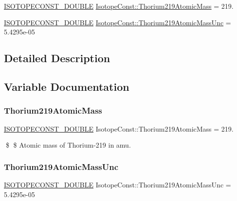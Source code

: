 \begin{DoxyCompactItemize}
\item 
\mbox{\hyperlink{group___isotope_const-_macros_ga8f45a7272ce02c0b4c65c44636ed719a}{I\+S\+O\+T\+O\+P\+E\+C\+O\+N\+S\+T\+\_\+\+D\+O\+U\+B\+LE}} \mbox{\hyperlink{group___isotope_const-_thorium-_th219_ga52852a0c7b61b350a2b85c043e5eaa58}{Isotope\+Const\+::\+Thorium219\+Atomic\+Mass}} = 219.
\item 
\mbox{\hyperlink{group___isotope_const-_macros_ga8f45a7272ce02c0b4c65c44636ed719a}{I\+S\+O\+T\+O\+P\+E\+C\+O\+N\+S\+T\+\_\+\+D\+O\+U\+B\+LE}} \mbox{\hyperlink{group___isotope_const-_thorium-_th219_gaa8bd56651616eb011b84f09976770a04}{Isotope\+Const\+::\+Thorium219\+Atomic\+Mass\+Unc}} = 5.\+4295e-\/05
\end{DoxyCompactItemize}


\subsection{Detailed Description}


\subsection{Variable Documentation}
\mbox{\label{group___isotope_const-_thorium-_th219_ga52852a0c7b61b350a2b85c043e5eaa58}} 
\subsubsection{\texorpdfstring{Thorium219\+Atomic\+Mass}{Thorium219AtomicMass}}
{\footnotesize\ttfamily \mbox{\hyperlink{group___isotope_const-_macros_ga8f45a7272ce02c0b4c65c44636ed719a}{I\+S\+O\+T\+O\+P\+E\+C\+O\+N\+S\+T\+\_\+\+D\+O\+U\+B\+LE}} Isotope\+Const\+::\+Thorium219\+Atomic\+Mass = 219.}

\$ \$ Atomic mass of Thorium-\/219 in amu. \mbox{\label{group___isotope_const-_thorium-_th219_gaa8bd56651616eb011b84f09976770a04}} 
\subsubsection{\texorpdfstring{Thorium219\+Atomic\+Mass\+Unc}{Thorium219AtomicMassUnc}}
{\footnotesize\ttfamily \mbox{\hyperlink{group___isotope_const-_macros_ga8f45a7272ce02c0b4c65c44636ed719a}{I\+S\+O\+T\+O\+P\+E\+C\+O\+N\+S\+T\+\_\+\+D\+O\+U\+B\+LE}} Isotope\+Const\+::\+Thorium219\+Atomic\+Mass\+Unc = 5.\+4295e-\/05}

